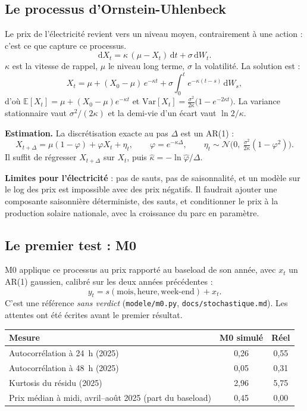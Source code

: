 \documentclass[11pt,a4paper]{article}
\newcommand{\code}[1]{\texttt{\small #1}}
\begin{document}
\subsection{Le processus d'Ornstein-Uhlenbeck}

Le prix de l'électricité revient vers un niveau moyen, contrairement à une action : c'est ce que capture ce processus.
\[
\mathrm{d}X_t = \kappa\,(\mu - X_t)\,\mathrm{d}t + \sigma\,\mathrm{d}W_t .
\]
$\kappa$ est la vitesse de rappel, $\mu$ le niveau long terme, $\sigma$ la volatilité. La solution est :
\[
X_t = \mu + (X_0 - \mu)\,e^{-\kappa t} + \sigma\int_0^t e^{-\kappa (t-s)}\,\mathrm{d}W_s ,
\]
d'où $\mathbb{E}[X_t] = \mu + (X_0 - \mu)e^{-\kappa t}$ et $\mathrm{Var}[X_t] = \frac{\sigma^2}{2\kappa}\big(1 - e^{-2\kappa t}\big)$. La variance stationnaire vaut $\sigma^2/(2\kappa)$ et la demi-vie d'un écart vaut $\ln 2 / \kappa$.

\textbf{Estimation.} La discrétisation exacte au pas $\Delta$ est un AR(1) :
\[
X_{t+\Delta} = \mu(1-\varphi) + \varphi X_t + \eta_t,
\qquad \varphi = e^{-\kappa\Delta},
\qquad \eta_t \sim \mathcal N\Big(0,\ \tfrac{\sigma^2}{2\kappa}(1-\varphi^2)\Big).
\]
Il suffit de régresser $X_{t+\Delta}$ sur $X_t$, puis $\hat\kappa = -\ln\hat\varphi / \Delta$.

\textbf{Limites pour l'électricité} : pas de sauts, pas de saisonnalité, et un modèle sur le log des prix est impossible avec des prix négatifs. Il faudrait ajouter une composante saisonnière déterministe, des sauts, et conditionner le prix à la production solaire nationale, avec la croissance du parc en paramètre.

\subsection{Le premier test : M0}

M0 applique ce processus au prix rapporté au baseload de son année, avec $x_t$ un AR(1) gaussien, calibré sur les deux années précédentes :
\[
y_t = s(\text{mois}, \text{heure}, \text{week-end}) + x_t .
\]
 C'est une référence \emph{sans verdict} (\code{modele/m0.py}, \code{docs/stochastique.md}). Les attentes ont été écrites avant le premier résultat.

\begin{center}
\small
\begin{tabular}{lcc}
\toprule
\textbf{Mesure} & \textbf{M0 simulé} & \textbf{Réel} \\
\midrule
Autocorrélation à 24~h (2025) & 0,26 & 0,55 \\
Autocorrélation à 48~h (2025) & 0,05 & 0,31 \\
Kurtosis du résidu (2025) & 2,96 & 5,75 \\
Prix médian à midi, avril--août 2025 (part du baseload) & 0,45 & 0,00 \\
\bottomrule
\end{tabular}
\end{center}
\end{document}
